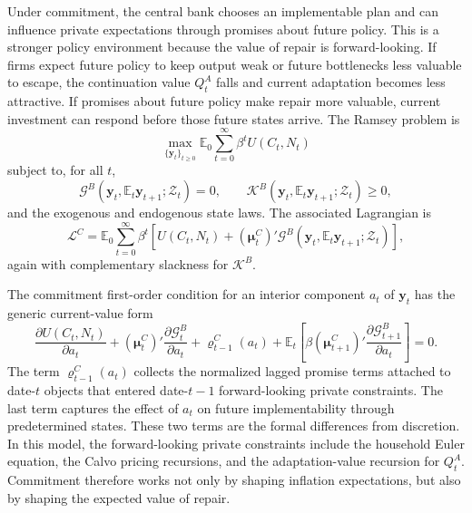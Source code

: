 ﻿\documentclass[12pt]{article}
\theoremstyle{remark}
\newcommand{\E}{\mathbb E}
\begin{document}
Under commitment, the central bank chooses an implementable plan and can influence private
expectations through promises about future policy. This is a stronger policy environment because
the value of repair is forward-looking. If firms expect future policy to keep output weak or
future bottlenecks less valuable to escape, the continuation value $Q_t^A$ falls and current
adaptation becomes less attractive. If promises about future policy make repair more valuable,
current investment can respond before those future states arrive. The Ramsey problem is
\begin{equation}
    \max_{\{\mathbf y_t\}_{t\ge 0}}
    \E_0
    \sum_{t=0}^{\infty}
    \beta^t
    U(C_t,N_t)
    \label{eq:commitment_ramsey_problem}
\end{equation}
subject to, for all $t$,
\begin{equation}
    \mathcal G^B
    \left(
        \mathbf y_t,
        \E_t\mathbf y_{t+1};
        \mathcal Z_t
    \right)
    =
    0,
    \qquad
    \mathcal K^B
    \left(
        \mathbf y_t,
        \E_t\mathbf y_{t+1};
        \mathcal Z_t
    \right)
    \ge 0,
    \label{eq:commitment_constraints}
\end{equation}
and the exogenous and endogenous state laws. The associated Lagrangian is
\begin{equation}
    \mathcal L^C
    =
    \E_0
    \sum_{t=0}^{\infty}
    \beta^t
    \left[
        U(C_t,N_t)
        +
        (\boldsymbol\mu_t^C)'
        \mathcal G^B
        \left(
            \mathbf y_t,
            \E_t\mathbf y_{t+1};
            \mathcal Z_t
        \right)
    \right],
    \label{eq:commitment_lagrangian}
\end{equation}
again with complementary slackness for $\mathcal K^B$.

The commitment first-order condition for an interior component $a_t$ of $\mathbf y_t$ has the
generic current-value form
\begin{equation}
    \frac{\partial U(C_t,N_t)}{\partial a_t}
    +
    (\boldsymbol\mu_t^C)'
    \frac{\partial \mathcal G_t^B}{\partial a_t}
    +
    \boldsymbol\varrho_{t-1}^C(a_t)
    +
    \E_t
    \left[
        \beta
        (\boldsymbol\mu_{t+1}^C)'
        \frac{\partial \mathcal G_{t+1}^B}{\partial a_t}
    \right]
    =
    0.
    \label{eq:commitment_foc_generic}
\end{equation}
The term $\boldsymbol\varrho_{t-1}^C(a_t)$ collects the normalized lagged promise terms attached to
date-$t$ objects that entered date-$t-1$ forward-looking private constraints. The last term captures
the effect of $a_t$ on future implementability through predetermined states. These two terms are the
formal differences from discretion. In this model, the forward-looking private constraints include
the household Euler equation, the Calvo pricing recursions, and the adaptation-value recursion for
$Q_t^A$. Commitment therefore works not only by shaping inflation expectations, but also by shaping
the expected value of repair.
\end{document}
